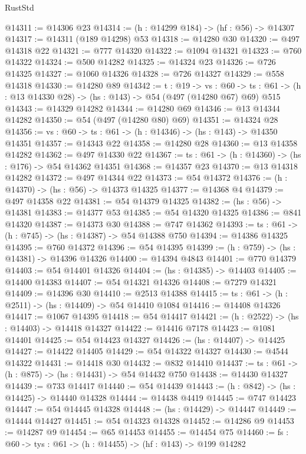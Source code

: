\begin{lexlean}{RustStd}
\begin{coremodule}
@14311 := @14306 @23
@14314 := (h : @14299 @184) -> (hf : @56) -> @14307
@14317 := @14311 (@189 @14298) @53
@14318 := @14280 @30
@14320 := @497 @14318 @22
@14321 := @777 @14320
@14322 := @1094 @14321
@14323 := @760 @14322
@14324 := @500 @14282
@14325 := @14324 @23
@14326 := @726 @14325
@14327 := @1060 @14326
@14328 := @726 @14327
@14329 := @558 @14318
@14330 := @14280 @89
@14342 := {t : @19} ->
  {vs : @60} ->
  {ts : @61} -> (h : @13 @14330 @28) -> (hs : @143) -> @54 (@497 (@14280 @67) @69) @515
@14343 := @14329 @14282
@14344 := @14280 @69
@14346 := @13 @14344 @14282
@14350 := @54 (@497 (@14280 @80) @69)
@14351 := @14324 @28
@14356 := {vs : @60} -> {ts : @61} -> (h : @14346) -> (hs : @143) -> @14350 @14351
@14357 := @14343 @22
@14358 := @14280 @28
@14360 := @13 @14358 @14282
@14362 := @497 @14330 @22
@14367 := {ts : @61} -> (h : @14360) -> (hs : @176) -> @54 @14362 @14351
@14368 := @14357 @23
@14370 := @13 @14318 @14282
@14372 := @497 @14344 @22
@14373 := @54 @14372
@14376 := (h : @14370) -> (hs : @56) -> @14373 @14325
@14377 := @14368 @4
@14379 := @497 @14358 @22
@14381 := @54 @14379 @14325
@14382 := (hs : @56) -> @14381
@14383 := @14377 @53
@14385 := @54 @14320 @14325
@14386 := @841 @14320
@14387 := @14373 @30
@14388 := @747 @14362
@14393 := {ts : @61} -> (h : @745) -> (hs : @14387) -> @54 @14388 @750
@14394 := @14386 @14325
@14395 := @760 @14372
@14396 := @54 @14395
@14399 := (h : @759) -> (hs : @14381) -> @14396 @14326
@14400 := @14394 @4843
@14401 := @770 @14379
@14403 := @54 @14401 @14326
@14404 := (hs : @14385) -> @14403
@14405 := @14400 @14383
@14407 := @54 @14321 @14326
@14408 := @7279 @14321
@14409 := @14396 @30
@14410 := @2513 @14388
@14415 := {ts : @61} -> (h : @2511) -> (hs : @14409) -> @54 @14410 @1084
@14416 := @14408 @14326
@14417 := @1067 @14395
@14418 := @54 @14417
@14421 := (h : @2522) -> (hs : @14403) -> @14418 @14327
@14422 := @14416 @7178
@14423 := @1081 @14401
@14425 := @54 @14423 @14327
@14426 := (hs : @14407) -> @14425
@14427 := @14422 @14405
@14429 := @54 @14322 @14327
@14430 := @4544 @14322
@14431 := @14418 @30
@14432 := @832 @14410
@14437 := {ts : @61} -> (h : @875) -> (hs : @14431) -> @54 @14432 @750
@14438 := @14430 @14327
@14439 := @733 @14417
@14440 := @54 @14439
@14443 := (h : @842) -> (hs : @14425) -> @14440 @14328
@14444 := @14438 @4419
@14445 := @747 @14423
@14447 := @54 @14445 @14328
@14448 := (hs : @14429) -> @14447
@14449 := @14444 @14427
@14451 := @54 @14323 @14328
@14452 := @14286 @9
@14453 := @14287 @9
@14454 := @65 @14453
@14455 := @14454 @75
@14460 := {fs : @60} -> {tys : @61} -> (h : @14455) -> (hf : @143) -> @199 @14282

\end{coremodule}
\end{lexlean}
